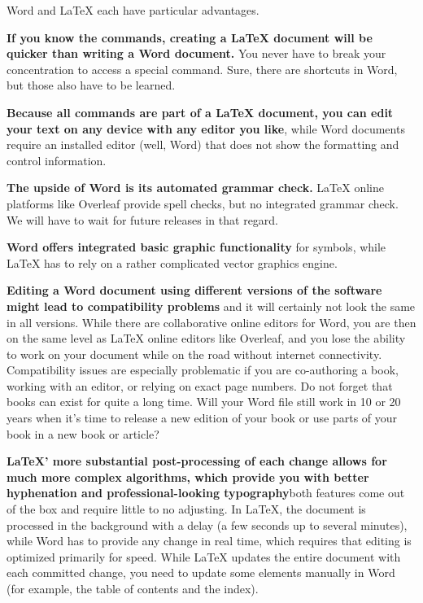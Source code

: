

Word and LaTeX each have particular advantages.

\textbf{If you know the commands, creating a LaTeX document will be quicker than writing a Word document.} You never have to break your concentration to access a special command. Sure, there are shortcuts in Word, but those also have to be learned.

\textbf{Because all commands are part of a LaTeX document, you can edit your text on any device with any editor you like}, while Word documents require an installed editor (well, Word) that does not show the formatting and control information.

\textbf{The upside of Word is its automated grammar check.} LaTeX online platforms like Overleaf provide spell checks, but no integrated grammar check. We will have to wait for future releases in that regard.

\textbf{Word offers integrated basic graphic functionality} for symbols, while LaTeX has to rely on a rather complicated vector graphics engine.

\textbf{Editing a Word document using different versions of the software might lead to compatibility problems} and it will certainly not look the same in all versions. While there are collaborative online editors for Word, you are then on the same level as LaTeX online editors like Overleaf, and you lose the ability to work on your document while on the road without internet connectivity. Compatibility issues are especially problematic if you are co-authoring a book, working with an editor, or relying on exact page numbers. Do not forget that books can exist for quite a long time. Will your Word file still work in 10 or 20 years when it's time to release a new edition of your book or use parts of your book in a new book or article?

\textbf{LaTeX' more substantial post-processing of each change allows for much more complex algorithms, which provide you with better hyphenation and professional\hyp{}looking typography}\emdash{}both features come out of the box and require little to no adjusting. In LaTeX, the document is processed in the background with a delay (a few seconds up to several minutes), while Word has to provide any change in real time, which requires that editing is optimized primarily for speed. While LaTeX updates the entire document with each committed change, you need to update some elements manually in Word (for example, the table of contents and the index).

